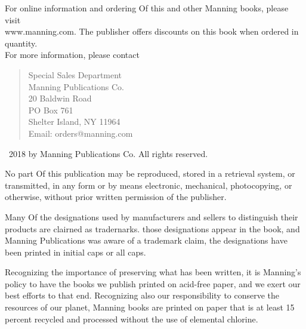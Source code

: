 \documentclass[a4paper,twoside,openany]{book}
\begin{document}
	{
	\AuthorNameFont\fontsize{11}{12}\selectfont
	\noindent For online information and ordering Of this and other Manning books, please visit \\[2pt]
	www.manning.com. The publisher offers discounts on this book when ordered in quantity. \\[2pt] 
	For more information, please contact
	
	\begin{verse}
		Special Sales Department \\[1pt]
		Manning Publications Co. \\[1pt]
		20 Baldwin Road \\[1pt]
		PO Box 761 \\[1pt]
		Shelter Island, NY 11964 \\[1pt]
		Email: orders@manning.com
	\end{verse}
	
	\vspace{0.5cm}
	
	\noindent\textcopyright\ 2018 by Manning Publications Co. All rights reserved.
	
	\vspace{30pt}
	
	\par\noindent No part Of this publication may be reproduced, stored in a retrieval system, or 			transmitted, in any form or by means electronic, mechanical, photocopying, or otherwise, without 		prior written permission of the publisher.
	
	\vspace{30pt}
	
	\par\noindent Many Of the designations used by manufacturers and sellers to distinguish their 			products are clairned as tradernarks. those designations appear in the book, and Manning 				Publications was aware of a trademark claim, the designations have been printed in initial caps or 		all caps.
	
	\vspace{30pt}
	
	\llap{\scalebox{0.8}{$\acidfree$}\hspace{4pt}\vspace*{-11pt}}\noindent Recognizing the importance 		of preserving what has been written, it is Manning's policy to have the books we publish printed on 	acid-free paper, and we exert our best efforts to that end. Recognizing also our responsibility to 		conserve the resources of our planet, Manning books are printed on paper that is at least 15 			percent recycled and processed without the use of elemental chlorine.
	
}
\end{document}
